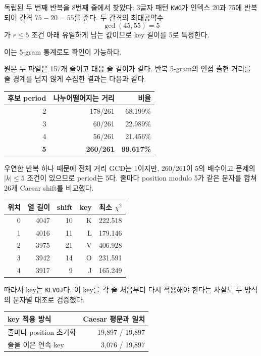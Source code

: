 \documentclass[10pt,a4paper]{article}
\begin{document}
독립된 두 번째 반복을 8번째 줄에서 찾았다: 3글자 패턴 \texttt{KWG}가
인덱스 20과 75에 반복되어 간격 $75-20=55$를 준다. 두 간격의
최대공약수
\[
 \gcd(45,55)=5
\]
가 $r\le5$ 조건 아래 유일하게 남는 값이므로 key 길이를 5로 특정한다.


이는 5-gram 통계로도 확인이 가능하다. 

원본 두 파일은 157개 줄이고 대응 줄 길이가 같다. 반복 5-gram의
인접 출현 거리를 줄 경계를 넘지 않게 수집한 결과는 다음과 같다.

\begin{center}
\begin{tabular}{rrr}
\toprule
후보 period & 나누어떨어지는 거리 & 비율 \\
\midrule
2 & 178/261 & 68.199\% \\
3 & 60/261 & 22.989\% \\
4 & 56/261 & 21.456\% \\
\textbf{5} & \textbf{260/261} & \textbf{99.617\%} \\
\bottomrule
\end{tabular}
\end{center}

우연한 반복 하나 때문에 전체 거리 GCD는 1이지만, 260/261이 5의
배수이고 문제의 $|k|\le5$ 조건이 있으므로 period는 5다. 줄마다
position modulo 5가 같은 문자를 합쳐 26개 Caesar shift를 비교했다.

\begin{center}
\begin{tabular}{rrrrr}
\toprule
위치 & 열 길이 & shift & key & 최소 $\chi^2$ \\
\midrule
0 & 4047 & 10 & K & 222.518 \\
1 & 4016 & 11 & L & 179.146 \\
2 & 3975 & 21 & V & 406.928 \\
3 & 3942 & 14 & O & 231.591 \\
4 & 3917 & 9 & J & 165.249 \\
\bottomrule
\end{tabular}
\end{center}

따라서 key는 \texttt{KLVOJ}다. 이 key를 각 줄 처음부터 다시 적용해야
한다는 사실도 두 방식의 문자별 대조로 검증했다.

\begin{center}
\begin{tabular}{lr}
\toprule
key 적용 방식 & Caesar 평문과 일치 \\
\midrule
줄마다 position 초기화 & 19,897 / 19,897 \\
줄을 이은 연속 key & 3,076 / 19,897 \\
\bottomrule
\end{tabular}
\end{center}
\end{document}
